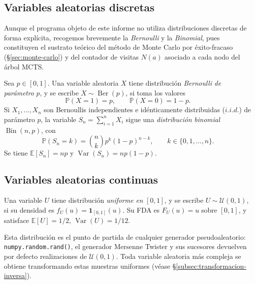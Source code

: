 \subsection{Variables aleatorias discretas}
\label{subsec:va-discretas}

Aunque el programa objeto de este informe no utiliza distribuciones discretas de forma explícita, recogemos brevemente la \emph{Bernoulli} y la \emph{Binomial}, pues constituyen el sustrato teórico del método de Monte Carlo por éxito-fracaso (§\ref{sec:monte-carlo}) y del contador de visitas $N(a)$ asociado a cada nodo del árbol MCTS.

\begin{definicion}
\label{def:bernoulli-binomial}
Sea $p \in [0,1]$. Una variable aleatoria $X$ tiene distribución \emph{Bernoulli de parámetro $p$}, y se escribe $X \sim \operatorname{Ber}(p)$, si toma los valores
\[
    \mathbb{P}(X = 1) = p, \qquad \mathbb{P}(X = 0) = 1 - p.
\]
Si $X_1, \ldots, X_n$ son Bernoullis independientes e idénticamente distribuidas ($i.i.d.$) de parámetro $p$, la variable $S_n = \sum_{i=1}^{n} X_i$ sigue una \emph{distribución binomial} $\operatorname{Bin}(n, p)$, con
\[
    \mathbb{P}(S_n = k) = \binom{n}{k} p^k (1-p)^{n-k}, \qquad k \in \{0, 1, \ldots, n\}.
\]
Se tiene $\mathbb{E}[S_n] = np$ y $\operatorname{Var}(S_n) = np(1-p)$.
\end{definicion}

\subsection{Variables aleatorias continuas}
\label{subsec:va-continuas}

\begin{definicion}
\label{def:uniforme}
Una variable $U$ tiene distribución \emph{uniforme en $[0,1]$}, y se escribe $U \sim \mathcal{U}(0,1)$, si su densidad es $f_U(u) = \mathbf{1}_{[0,1]}(u)$. Su FDA es $F_U(u) = u$ sobre $[0,1]$, y satisface $\mathbb{E}[U] = 1/2$, $\operatorname{Var}(U) = 1/12$.
\end{definicion}

Esta distribución es el punto de partida de cualquier generador pseudoaleatorio: \\ \texttt{numpy.random.rand()}, el generador Mersenne Twister y sus sucesores devuelven por defecto realizaciones de $\mathcal{U}(0,1)$. Toda variable aleatoria más compleja se obtiene transformando estas muestras uniformes (véase §\ref{subsec:transformacion-inversa}).

